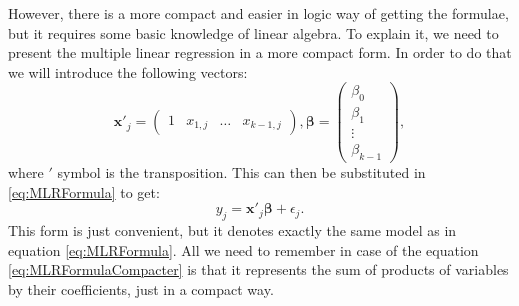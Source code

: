 \documentclass[
]{book}
\theoremstyle{definition}
\theoremstyle{definition}
\theoremstyle{definition}
\theoremstyle{definition}
\theoremstyle{remark}
\begin{document}
However, there is a more compact and easier in logic way of getting the formulae, but it requires some basic knowledge of linear algebra. To explain it, we need to present the multiple linear regression in a more compact form. In order to do that we will introduce the following vectors:
\begin{equation}
    \mathbf{x}'_j = \begin{pmatrix}1 & x_{1,j} & \dots & x_{k-1,j} \end{pmatrix},
    \boldsymbol{\beta} = \begin{pmatrix}\beta_0 \\ \beta_{1} \\ \vdots \\ \beta_{k-1} \end{pmatrix} ,
    \label{eq:MLRVectors}
\end{equation}
where \('\) symbol is the transposition. This can then be substituted in \eqref{eq:MLRFormula} to get:
\begin{equation}
    y_j = \mathbf{x}'_j \boldsymbol{\beta} + \epsilon_j .
    \label{eq:MLRFormulaCompacter}
\end{equation}
This form is just convenient, but it denotes exactly the same model as in equation \eqref{eq:MLRFormula}. All we need to remember in case of the equation \eqref{eq:MLRFormulaCompacter} is that it represents the sum of products of variables by their coefficients, just in a compact way.
\end{document}
